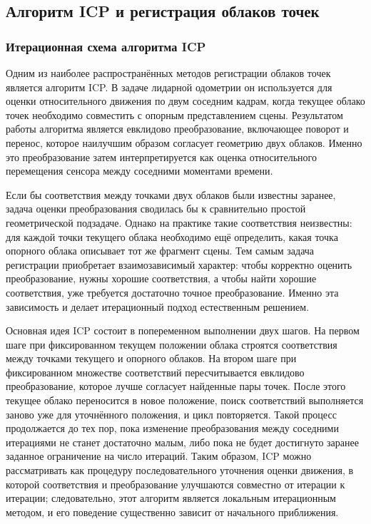 \subsection{Алгоритм ICP и регистрация облаков точек}
\label{sec:1-2-icp}

\subsubsection{Итерационная схема алгоритма ICP}

Одним из наиболее распространённых методов регистрации облаков точек является алгоритм ICP. В задаче лидарной одометрии он используется для оценки относительного движения по двум соседним кадрам, когда текущее облако точек необходимо совместить с опорным представлением сцены. Результатом работы алгоритма является евклидово преобразование, включающее поворот и перенос, которое наилучшим образом согласует геометрию двух облаков. Именно это преобразование затем интерпретируется как оценка относительного перемещения сенсора между соседними моментами времени.

Если бы соответствия между точками двух облаков были известны заранее, задача оценки преобразования сводилась бы к сравнительно простой геометрической подзадаче. Однако на практике такие соответствия неизвестны: для каждой точки текущего облака необходимо ещё определить, какая точка опорного облака описывает тот же фрагмент сцены. Тем самым задача регистрации приобретает взаимозависимый характер: чтобы корректно оценить преобразование, нужны хорошие соответствия, а чтобы найти хорошие соответствия, уже требуется достаточно точное преобразование. Именно эта зависимость и делает итерационный подход естественным решением.

Основная идея ICP состоит в попеременном выполнении двух шагов. На первом шаге при фиксированном текущем положении облака строятся соответствия между точками текущего и опорного облаков. На втором шаге при фиксированном множестве соответствий пересчитывается евклидово преобразование, которое лучше согласует найденные пары точек. После этого текущее облако переносится в новое положение, поиск соответствий выполняется заново уже для уточнённого положения, и цикл повторяется. Такой процесс продолжается до тех пор, пока изменение преобразования между соседними итерациями не станет достаточно малым, либо пока не будет достигнуто заранее заданное ограничение на число итераций. Таким образом, ICP можно рассматривать как процедуру последовательного уточнения оценки движения, в которой соответствия и преобразование улучшаются совместно от итерации к итерации; следовательно, этот алгоритм является локальным итерационным методом, и его поведение существенно зависит от начального приближения.

